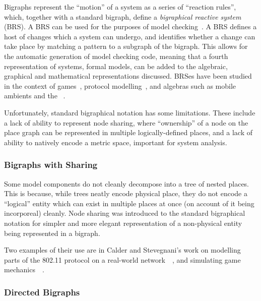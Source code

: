 Bigraphs represent the ``motion'' of a system as a series of ``reaction rules'',
which, together with a standard bigraph, define a \emph{bigraphical reactive
  system} (BRS). A BRS can be used for the purposes of model
checking~\cite{sevegnani2015bigraphs,perrone2012model}. A BRS defines a host of
changes which a system can undergo, and identifies whether a change can take
place by matching a pattern to a subgraph of the bigraph. This allows for the
automatic generation of model checking code, meaning that a fourth
representation of systems, formal models, can be added to the algebraic,
graphical and mathematical representations discussed. BRSes have been studied in
the context of games~\cite{benford2016lions}, protocol
modelling~\cite{calder2014modelling}, and algebras such as mobile
ambients and the \picalculus{}~\cite{milner2001bigraphical}.
\par

Unfortunately, standard bigraphical notation has some limitations. These include
a lack of ability to represent node sharing, where ``ownership'' of a node on
the place graph can be represented in multiple logically-defined places, and a
lack of ability to natively encode a metric space, important for system analysis.
\par

\subsubsection{Bigraphs with Sharing}

Some model components do not cleanly decompose into a tree of nested places.
This is because, while trees neatly encode physical place, they do not encode a
``logical'' entity which can exist in multiple places at once (on account of it
being incorporeal) cleanly. Node sharing was introduced to the standard
bigraphical notation for simpler and more elegant representation of a
non-physical entity being represented in a bigraph. 
\par

Two examples of their use are in Calder and Stevegnani's work on modelling parts
of the 802.11 protocol on a real-world network~\cite{calder2014modelling}~, and
simulating game mechanics~\cite{benford2016lions}~. 

\subsubsection{Directed Bigraphs}
\label{sec:review-directed-bigraphs}

